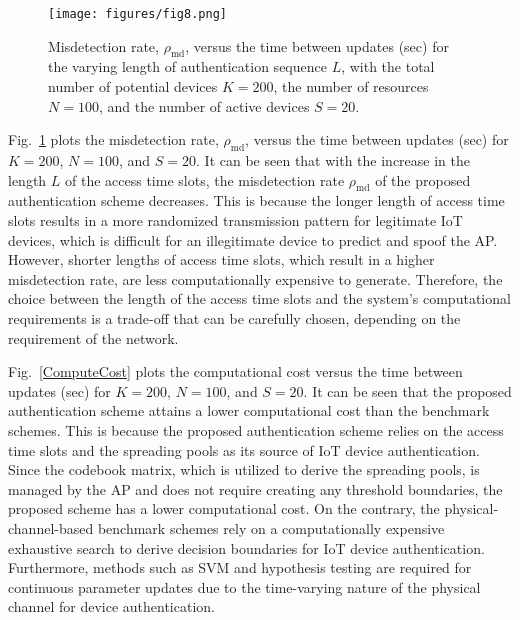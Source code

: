 \documentclass[journal,10pt]{IEEEtran}
\begin{document}
\begin{figure}[t] 
\centering
\texttt{[image: figures/fig8.png]}
\caption{Misdetection rate, $\rho_{\mathrm{md}}$, versus the time between updates (sec) for the varying length of authentication sequence $L$, with the total number of potential devices $K = 200$, the number of resources $N = 100$, and the number of active devices $S = 20$.}
\label{misdetectionrate_varyingOF_2}
\end{figure}


Fig.~\ref{misdetectionrate_varyingOF_2} plots the misdetection rate, $\rho_{\mathrm{md}}$, versus the time between updates (sec) for $K = 200$, $N = 100$, and $S = 20$. It can be seen that with the increase in the length $L$ of the access time slots, the misdetection rate $\rho_{\mathrm{md}}$ of the proposed authentication scheme decreases. This is because the longer length of access time slots results in a more randomized transmission pattern for legitimate IoT devices, which is difficult for an illegitimate device to predict and spoof the AP. However, shorter lengths of access time slots, which result in a higher misdetection rate, are less computationally expensive to generate. Therefore, the choice between the length of the access time slots and the system's computational requirements is a trade-off that can be carefully chosen, depending on the requirement of the network.


Fig.~\ref{ComputeCost} plots the computational cost versus the time between updates (sec) for $K = 200$, $N = 100$, and $S = 20$. It can be seen that the proposed authentication scheme attains a lower computational cost than the benchmark schemes. This is because the proposed authentication scheme relies on the access time slots and the spreading pools as its source of IoT device authentication. Since the codebook matrix, which is utilized to derive the spreading pools, is managed by the AP and does not require creating any threshold boundaries, the proposed scheme has a lower computational cost. On the contrary, the physical-channel-based benchmark schemes rely on a computationally expensive exhaustive search to derive decision boundaries for IoT device authentication. Furthermore, methods such as SVM and hypothesis testing are required for continuous parameter updates due to the time-varying nature of the physical channel for device authentication. 
\end{document}
